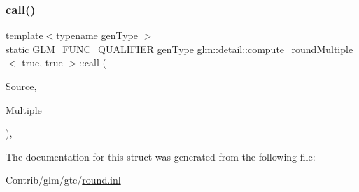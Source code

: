 \subsubsection{\texorpdfstring{call()}{call()}}
{\footnotesize\ttfamily template$<$typename gen\+Type $>$ \\
static \mbox{\hyperlink{setup_8hpp_a33fdea6f91c5f834105f7415e2a64407}{G\+L\+M\+\_\+\+F\+U\+N\+C\+\_\+\+Q\+U\+A\+L\+I\+F\+I\+ER}} \mbox{\hyperlink{structglm_1_1detail_1_1gen_type}{gen\+Type}} \mbox{\hyperlink{structglm_1_1detail_1_1compute__round_multiple}{glm\+::detail\+::compute\+\_\+round\+Multiple}}$<$ true, true $>$\+::call (\begin{DoxyParamCaption}\item[{\mbox{\hyperlink{structglm_1_1detail_1_1gen_type}{gen\+Type}}}]{Source,  }\item[{\mbox{\hyperlink{structglm_1_1detail_1_1gen_type}{gen\+Type}}}]{Multiple }\end{DoxyParamCaption})\hspace{0.3cm}{\ttfamily [inline]}, {\ttfamily [static]}}



The documentation for this struct was generated from the following file\+:\begin{DoxyCompactItemize}
\item 
Contrib/glm/gtc/\mbox{\hyperlink{round_8inl}{round.\+inl}}\end{DoxyCompactItemize}
